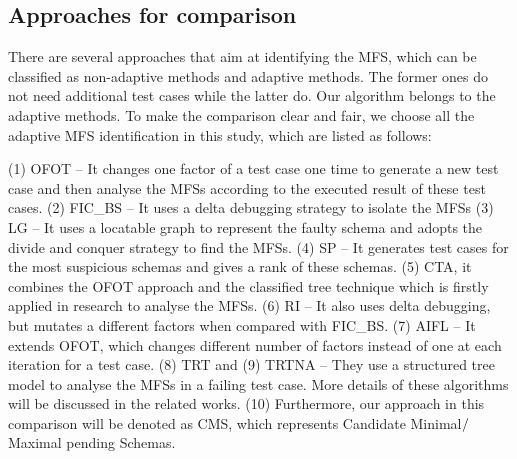 \documentclass{sig-alternate-05-2015}
\begin{document}
{{%
\subsection{Approaches for comparison}
There are several approaches that aim at identifying the MFS, which can be classified as non-adaptive methods and adaptive methods. The former ones do not need additional test cases while the latter do. Our algorithm belongs to the adaptive methods. To make the comparison clear and fair, we choose all the adaptive MFS identification in this study, which are listed as follows:

(1) OFOT \cite{nie2011minimal} -- It changes one factor of a test case one time to generate a new test case and then analyse the MFSs according to the executed result of these test cases. (2) FIC\_BS \cite{zhang2011characterizing} -- It uses a delta debugging strategy to isolate the MFSs (3) LG \cite{martinez2008algorithms,martinez2009locating} -- It uses a locatable graph to represent the faulty schema and adopts the divide and conquer strategy to find the MFSs. (4) SP\cite{ghandehari2012identifying} -- It generates test cases for the most suspicious schemas and gives a rank of these schemas. (5) CTA\cite{shakya2012isolating}, it combines the OFOT approach and the classified tree technique which is firstly applied in research \cite{yilmaz2006covering}  to analyse the MFSs. (6) RI \cite{li2012improved} -- It also uses delta debugging, but mutates a different factors  when compared with FIC\_BS. (7) AIFL \cite{wang2010adaptive} -- It extends OFOT, which changes different number of factors instead of one at each iteration for a test case. (8) TRT \cite{niu2013identifying} and (9) TRTNA \cite{niu2013identifying} --  They use a structured tree model to analyse the MFSs in a failing test case.  More details of these algorithms will be discussed in the related works. (10) Furthermore, our approach in this comparison will be denoted as CMS, which represents Candidate Minimal$\//$Maximal pending Schemas.

}}
\end{document}
